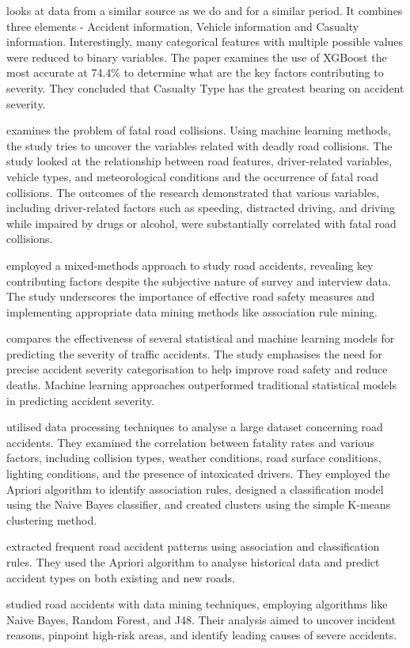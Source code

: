  \cite{Nour2020} looks at data from a similar source as we do and for a similar period.
It combines three elements - Accident information, Vehicle information and Casualty information.
Interestingly, many categorical features with multiple possible values were reduced to binary variables.
The paper examines the use of XGBoost the most accurate at 74.4\% to determine what are the key factors contributing to severity.
They concluded that Casualty Type has the greatest bearing on accident severity.



  \cite{ijerph17114111} examines the problem of fatal road collisions.
Using machine learning methods, the study tries to uncover the variables related with deadly road collisions.
The study looked at the relationship between road features, driver-related variables, vehicle types, and meteorological conditions and the occurrence of fatal road collisions.
The outcomes of the research demonstrated that various variables, including driver-related factors such as speeding, distracted driving, and driving while impaired by drugs or alcohol, were substantially correlated with fatal road collisions.


 \cite{rjrsmsfa} employed a mixed-methods approach to study road accidents, revealing key contributing factors despite the subjective nature of survey and interview data.
The study underscores the importance of effective road safety measures and implementing appropriate data mining methods like association rule mining.


 \cite{computers11050080} compares the effectiveness of several statistical and machine learning models for predicting the severity of traffic accidents.
The study emphasises the need for precise accident severity categorisation to help improve road safety and reduce deaths.
Machine learning approaches outperformed traditional statistical models in predicting accident severity.

 \cite{7965753} utilised data processing techniques to analyse a large dataset concerning road accidents.
They examined the correlation between fatality rates and various factors, including collision types, weather conditions, road surface conditions, lighting conditions, and the presence of intoxicated drivers.
They employed the Apriori algorithm to identify association rules, designed a classification model using the Naive Bayes classifier, and created clusters using the simple K-means clustering method.


 \cite{IRJET-V7I51291} extracted frequent road accident patterns using association and classification rules.
They used the Apriori algorithm to analyse historical data and predict accident types on both existing and new roads.

 \cite{Karthik2019IdentifyingER} studied road accidents with data mining techniques, employing algorithms like Naive Bayes, Random Forest, and J48.
Their analysis aimed to uncover incident reasons, pinpoint high-risk areas, and identify leading causes of severe accidents.